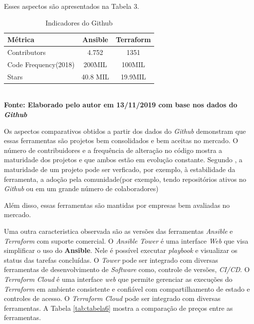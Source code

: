 Esses aspectos são apresentados na Tabela 3.

 
   \begin{table}[H]
	\centering
	\caption{\hspace{0.1cm} Indicadores do Github}
	\vspace{-0.3cm} %
	\label{tab:tabela5}
	\begin{tabular}{l|c|c}
  \hline
    \textbf{Métrica}	& \textbf{Ansible} & \textbf{Terraform} \\
    \hline
  Contributors & 4.752  & 1351\\
  Code Frequency(2018)  & 200MIL  &   100MIL  \\
  Stars & 40.8 MIL & 19.9MIL \\
     \hline
 \end{tabular}
 	\vspace{.1cm}  %
	\small
	{\footnotesize\\ \textbf{Fonte: Elaborado pelo autor em 13/11/2019 com base nos dados do \textit{Github}}}
\end{table}

Os aspectos comparativos obtidos a partir dos dados do \textit{Github} demonstram que essas ferramentas são projetos bem consolidados e bem aceitas no mercado. O número de contribuidores e a frequência de alteração no código mostra a maturidade dos projetos e que ambos estão em evolução constante. Segundo \cite{Guerriero}, a maturidade de um projeto pode ser verficado, por exemplo, à estabilidade da ferramenta, a adoção pela comunidade(por exemplo, tendo repositórios ativos no \textit{Github} ou em um grande número de colaboradores) 

Além disso, essas ferramentas são mantidas por empresas bem avaliadas no mercado.  

Uma outra caracteristica observada são as versões das ferramentas \textit{Ansible} e \textit{Terraform} com suporte comercial. O \textit{Ansible Tower} é uma interface \textit{Web} que visa simplificar o uso do \textbf{Ansible}. Nele é possível executar \textit{playbook} e visualizar os status das tarefas concluídas. O \textit{Tower} pode ser integrado com diversas ferramentas de desenvolvimento de \textit{Software} como, controle de versões, \textit{CI/CD}. O \textit{Terraform Cloud} é uma interface \textit{web} que permite gerenciar as execuções do \textit{Terraform} em ambiente consistente e confiável com compartilhamento de estado e controles de acesso. O \textit{Terraform Cloud} pode ser integrado com diversas ferramentas.  A Tabela \ref{tab:tabela6} mostra a comparação de preços entre as ferramentas. 

